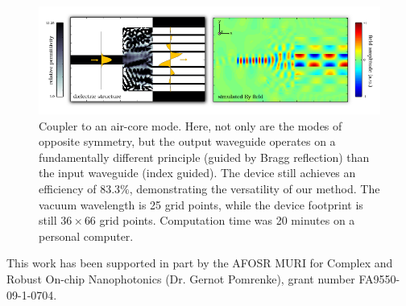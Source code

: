 \documentclass[letterpaper,10pt]{article}
\begin{document}
\begin{figure}[h]
    \centering
    \includegraphics[width=\textwidth]{quickfig/air-core}
    \caption{Coupler to an air-core mode.
        Here, not only are the modes of opposite symmetry,
        but the output waveguide operates on a fundamentally different
        principle (guided by Bragg reflection) than the input waveguide 
        (index guided).
        The device still achieves an efficiency of $83.3\%$, demonstrating the
        versatility of our method.
        The vacuum wavelength is 25 grid points, 
        while the device footprint is still $36 \times 66$ grid points.
        Computation time was 20 minutes on a personal computer.
        }
        \label{fig:aircore}
\end{figure}

This work has been supported in part by the 
    AFOSR MURI for Complex and Robust On-chip Nanophotonics 
    (Dr. Gernot Pomrenke), grant number FA9550-09-1-0704.
\end{document}
